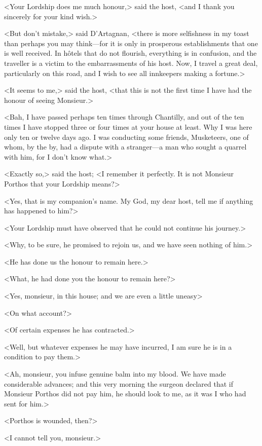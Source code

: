 <Your Lordship does me much honour,> said the host, <and I thank you sincerely for your kind wish.> 

<But don't mistake,> said D'Artagnan, <there is more selfishness in my toast than perhaps you may think—for it is only in prosperous establishments that one is well received. In hôtels that do not flourish, everything is in confusion, and the traveller is a victim to the embarrassments of his host. Now, I travel a great deal, particularly on this road, and I wish to see all innkeepers making a fortune.> 

<It seems to me,> said the host, <that this is not the first time I have had the honour of seeing Monsieur.> 

<Bah, I have passed perhaps ten times through Chantilly, and out of the ten times I have stopped three or four times at your house at least. Why I was here only ten or twelve days ago. I was conducting some friends, Musketeers, one of whom, by the by, had a dispute with a stranger—a man who sought a quarrel with him, for I don't know what.> 

<Exactly so,> said the host; <I remember it perfectly. It is not Monsieur Porthos that your Lordship means?> 

<Yes, that is my companion's name. My God, my dear host, tell me if anything has happened to him?> 

<Your Lordship must have observed that he could not continue his journey.> 

<Why, to be sure, he promised to rejoin us, and we have seen nothing of him.> 

<He has done us the honour to remain here.> 

<What, he had done you the honour to remain here?> 

<Yes, monsieur, in this house; and we are even a little uneasy\longdash> 

<On what account?> 

<Of certain expenses he has contracted.> 

<Well, but whatever expenses he may have incurred, I am sure he is in a condition to pay them.> 

<Ah, monsieur, you infuse genuine balm into my blood. We have made considerable advances; and this very morning the surgeon declared that if Monsieur Porthos did not pay him, he should look to me, as it was I who had sent for him.> 

<Porthos is wounded, then?> 

<I cannot tell you, monsieur.> 

